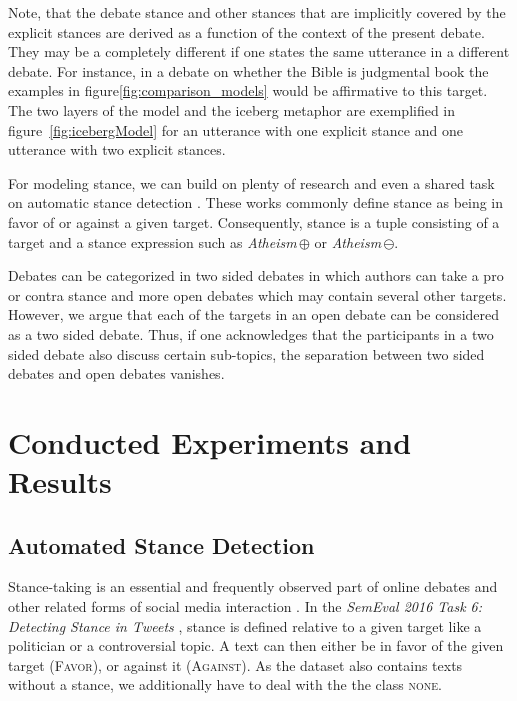 \documentclass[11pt]{article}
\begin{document}
Note, that the debate stance and other stances that are implicitly covered by the explicit stances are derived as a function of the context of the present debate. 
They may be a completely different if one states the same utterance in a different debate.
For instance, in a debate on whether the Bible is judgmental book the examples in figure\ref{fig:comparison_models} would be affirmative to this target.
The two layers of the model and the iceberg metaphor are exemplified in figure~\ref{fig:icebergModel} for an utterance with one explicit stance and one utterance with two explicit stances. 


For modeling stance, we can build on plenty of research \cite{anand2011cats,somasundaran2009recognizing,sridhar2014collective,hasan2013stance} and even a shared task on automatic stance detection \cite{StanceSemEval2016}.
These works commonly define stance as being in favor of or against a given target.
Consequently, stance is a tuple consisting of a target and a stance expression such as \textit{Atheism}\,$\oplus$ or \textit{Atheism}\,$\ominus$.

Debates can be categorized in two sided debates in which authors can take a pro or contra stance and more open debates which may contain several other targets.
However, we argue that each of the targets in an open debate can be considered as a two sided debate.
Thus, if one acknowledges that the participants in a two sided debate also discuss certain sub-topics, the separation between two sided debates and open debates vanishes. 


\section{Conducted Experiments and Results}

\subsection{Automated Stance Detection}
Stance-taking is an essential and frequently observed part of online debates and other related forms of social media interaction \cite{somasundaran2009recognizing,anand2011cats}. 
In the \textit{\mbox{SemEval} 2016 Task 6: Detecting Stance in Tweets} \cite{StanceSemEval2016}, stance is defined relative to a given target like a politician or a controversial topic.
A text can then either be in favor of the given target (\textsc{Favor}), or against it (\textsc{Against}).
As the dataset also contains texts without a stance, we additionally have to deal with the the class \textsc{none}.
\end{document}
